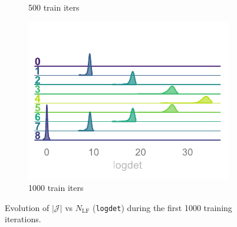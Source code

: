 \documentclass[a4paper,11pt]{article}
\begin{document}
\begin{figure}[htpb!]
\begin{subfigure}{0.31\textwidth}
        \caption{\label{subfig:logdet2} 500 train iters}
    \end{subfigure}
    \hfill
    \begin{subfigure}{0.31\textwidth}
        \includegraphics[width=\textwidth]{assets/logdet-3.pdf}
        \caption{\label{subfig:logdet3} 1000 train iters}
    \end{subfigure}
    \caption{\label{fig:logdet}Evolution of $\left|\mathcal{J}\right|$ vs $N_{\mathrm{LF}}$ (\texttt{logdet}) during the first 1000 training iterations.}
\end{figure}
%
%  
\end{document}
